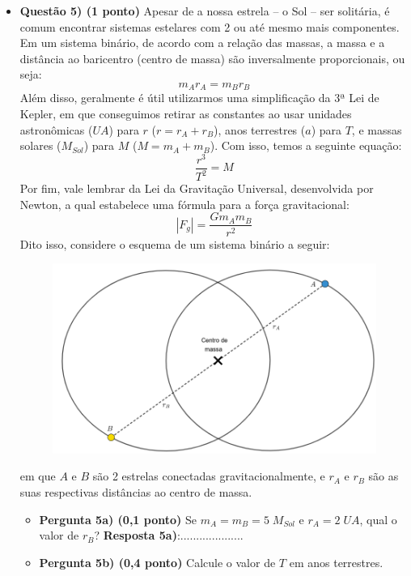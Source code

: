 \documentclass[a4paper, 12pt]{article}
\begin{document}
\begin{flushleft}
\begin{itemize}
		\item \textbf{Questão 5) (1 ponto)} Apesar de a nossa estrela -- o Sol -- ser solitária, é comum encontrar sistemas estelares com 2 ou até mesmo mais componentes. Em um sistema binário, de acordo com a relação das massas, a massa e a distância ao baricentro (centro de massa) são inversalmente proporcionais, ou seja:
			$$m_Ar_A=m_Br_B$$
		Além disso, geralmente é útil utilizarmos uma simplificação da 3ª Lei de Kepler, em que conseguimos retirar as constantes ao usar unidades astronômicas ($UA$) para $r$ ($r=r_A+r_B$), anos terrestres ($a$) para $T$, e massas solares ($M_{Sol}$) para $M$ ($M=m_A+m_B$). Com isso, temos a seguinte equação:
			$$\frac{r^3}{T^2}=M$$
		Por fim, vale lembrar da Lei da Gravitação Universal, desenvolvida por Newton, a qual estabelece uma fórmula para a força gravitacional:
			$$| F_g | = \frac{Gm_Am_B}{r^2}$$
		Dito isso, considere o esquema de um sistema binário a seguir:
			\begin{figure}[H]
				\centering
				\includegraphics[scale=0.4]{./img/5.png}
			\end{figure}
			em que $A$ e $B$ são 2 estrelas conectadas gravitacionalmente, e $r_A$ e $r_B$ são as suas respectivas distâncias ao centro de massa.
			\begin{itemize}
				\item \textbf{Pergunta 5a) (0,1 ponto)} Se $m_A=m_B= 5 \; M_{Sol}$ e $r_A=2 \; UA$, qual o valor de $r_B$?
					\linebreak \linebreak \linebreak \linebreak \linebreak \linebreak
					\textbf{Resposta 5a)}:....................
				\item \textbf{Pergunta 5b) (0,4 ponto)} Calcule o valor de $T$ em anos terrestres.

\end{itemize}
\end{itemize}
\end{flushleft}
\end{document}
